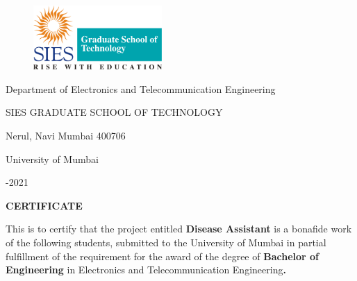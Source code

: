 \documentclass[12pt]{article}
\begin{document}
\begin{figure}[H]
	\begin{Center}
		\includegraphics[width=1.93in,height=0.96in]{./media/image1.png}
	\end{Center}
\end{figure}



\vspace{\baselineskip}
\setlength{\parskip}{0.0pt}
\setlength{\parskip}{9.96pt}
\setlength{\parskip}{0.0pt}
\begin{Center}
{\fontsize{14pt}{16.8pt}\selectfont Department of Electronics and Telecommunication Engineering }
\end{Center}
\begin{Center}
{\fontsize{14pt}{16.8pt}\selectfont SIES GRADUATE SCHOOL OF TECHNOLOGY}
\end{Center}
\begin{Center}
{\fontsize{14pt}{16.8pt}\selectfont Nerul, Navi Mumbai 400706}
\end{Center}
\begin{Center}
{\fontsize{14pt}{16.8pt}\selectfont University of Mumbai}
\end{Center}
\begin{Center}
{\fontsize{14pt}{16.8pt}-2021}
\end{Center}

\begin{Center}
{\fontsize{18pt}{21.6pt}\selectfont \textbf{CERTIFICATE}}
\end{Center}

\vspace{\baselineskip}
\setlength{\parskip}{9.96pt}
\begin{justify}
{\fontsize{16pt}{19.2pt}\selectfont This is to certify that the project entitled \textbf{Disease Assistant} is a bonafide work of the following students, submitted to the University of Mumbai in partial fulfillment of the requirement for the award of the degree of \textbf{Bachelor of Engineering} in Electronics and Telecommunication Engineering\textbf{.}\par}
\end{justify}
\end{document}
